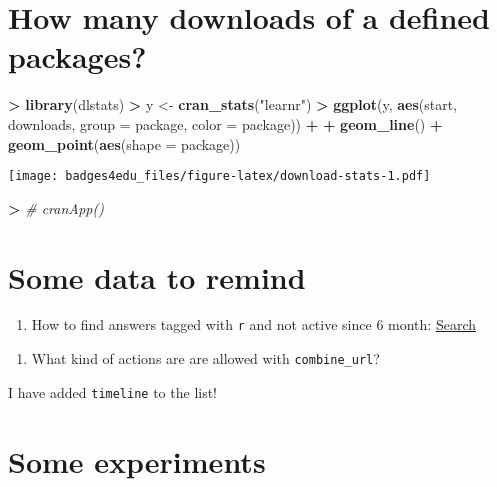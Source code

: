 \documentclass[]{book}
\newenvironment{Shaded}{\begin{snugshade}}{\end{snugshade}}
\newcommand{\KeywordTok}[1]{\textcolor[rgb]{0.13,0.29,0.53}{\textbf{#1}}}
\newcommand{\DataTypeTok}[1]{\textcolor[rgb]{0.13,0.29,0.53}{#1}}
\newcommand{\StringTok}[1]{\textcolor[rgb]{0.31,0.60,0.02}{#1}}
\newcommand{\CommentTok}[1]{\textcolor[rgb]{0.56,0.35,0.01}{\textit{#1}}}
\newcommand{\OperatorTok}[1]{\textcolor[rgb]{0.81,0.36,0.00}{\textbf{#1}}}
\newcommand{\NormalTok}[1]{#1}
\providecommand{\tightlist}{%
  \setlength{\itemsep}{0pt}\setlength{\parskip}{0pt}}
\theoremstyle{definition}
\theoremstyle{definition}
\theoremstyle{definition}
\theoremstyle{remark}
\begin{document}
\section{How many downloads of a defined
packages?}\label{how-many-downloads-of-a-defined-packages}

\begin{Shaded}
\begin{Highlighting}[]
\OperatorTok{>}\StringTok{ }\KeywordTok{library}\NormalTok{(dlstats)}
\OperatorTok{>}\StringTok{ }\NormalTok{y <-}\StringTok{ }\KeywordTok{cran_stats}\NormalTok{(}\StringTok{"learnr"}\NormalTok{)}
\OperatorTok{>}\StringTok{ }\KeywordTok{ggplot}\NormalTok{(y, }\KeywordTok{aes}\NormalTok{(start, downloads, }\DataTypeTok{group =}\NormalTok{ package, }\DataTypeTok{color =}\NormalTok{ package)) }\OperatorTok{+}
\OperatorTok{+}\StringTok{         }\KeywordTok{geom_line}\NormalTok{() }\OperatorTok{+}\StringTok{ }\KeywordTok{geom_point}\NormalTok{(}\KeywordTok{aes}\NormalTok{(}\DataTypeTok{shape =}\NormalTok{ package))}
\end{Highlighting}
\end{Shaded}

\texttt{[image: badges4edu\_files/figure-latex/download-stats-1.pdf]}

\begin{Shaded}
\begin{Highlighting}[]
\OperatorTok{>}\StringTok{ }\CommentTok{# cranApp()}
\end{Highlighting}
\end{Shaded}

\section{Some data to remind}\label{some-data-to-remind}

\begin{enumerate}
\def\labelenumi{\arabic{enumi}.}
\tightlist
\item
  How to find answers tagged with \texttt{r} and not active since 6
  month:
  \href{https://stackoverflow.com/search?q=\%5Br\%5D+lastactive\%3A..6m+is\%3Aa}{Search}
\end{enumerate}

\begin{enumerate}
\def\labelenumi{\arabic{enumi}.}
\setcounter{enumi}{2}
\tightlist
\item
  What kind of actions are are allowed with \texttt{combine\_url}?
\end{enumerate}

I have added \texttt{timeline} to the list!

\section{Some experiments}\label{some-experiments}


\end{document}
